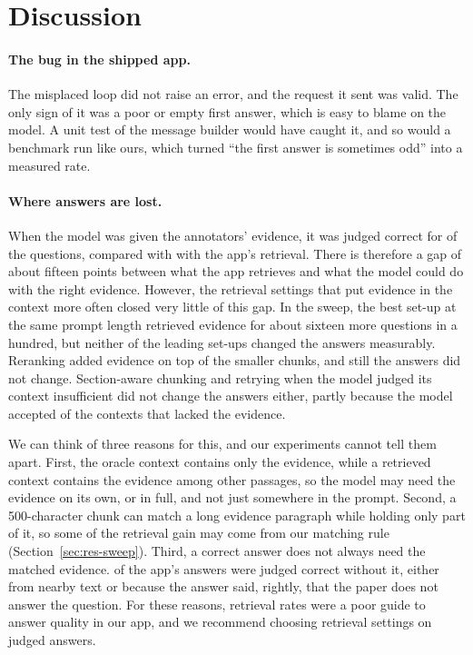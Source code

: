 \section{Discussion}
\label{sec:discussion}

\paragraph{The bug in the shipped app.} The misplaced loop did not raise an error, and the
request it sent was valid. The only sign of it was a poor or empty first answer, which is easy to
blame on the model. A unit test of the message builder would have caught it, and so would a
benchmark run like ours, which turned ``the first answer is sometimes odd'' into a measured rate.

\paragraph{Where answers are lost.} When the model was given the annotators' evidence, it was
judged correct for \OracleCorrect{} of the questions, compared with \FixedCorrect{} with the app's
retrieval. There is therefore a gap of about fifteen points between what the app retrieves and
what the model could do with the right evidence. However, the retrieval settings that put
evidence in the context more often closed very little of this gap. In the sweep, the best set-up
at the same prompt length retrieved evidence for about sixteen more questions in a hundred, but
neither of the leading set-ups changed the answers measurably. Reranking added evidence on top of
the smaller chunks, and still the answers did not change. Section-aware chunking and retrying
when the model judged its context insufficient did not change the answers either, partly because
the model accepted \RetryMissedKeptRate{} of the contexts that lacked the evidence.

We can think of three reasons for this, and our experiments cannot tell them apart. First, the
oracle context contains only the evidence, while a retrieved context contains the evidence
among other passages, so the model may need the evidence on its own, or in full, and not just
somewhere in the prompt. Second, a 500-character chunk can match a long evidence paragraph while
holding only part of it, so some of the retrieval gain may come from our matching rule
(Section~\ref{sec:res-sweep}). Third, a correct answer does not always need the matched
evidence. \CorrectWhenMiss{} of the app's answers were judged correct without it, either from
nearby text or because the answer said, rightly, that the paper does not answer the question.
For these reasons, retrieval rates were a poor guide to answer quality in our app, and we
recommend choosing retrieval settings on judged answers.

